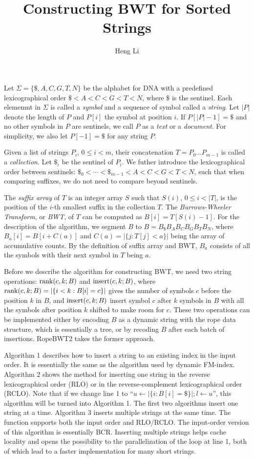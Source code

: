 \documentclass[10pt]{article}
\title{Constructing BWT for Sorted Strings}
\author{Heng Li}
\begin{document}
\maketitle

Let $\Sigma=\{\$,A,C,G,T,N\}$ be the alphabet for DNA with a predefined
lexicographical order $\$<A<C<G<T<N$, where $\$$ is the sentinel.  Each
elememnt in $\Sigma$ is called a \emph{symbol} and a sequence of symbol called
a \emph{string}. Let $|P|$ denote the length of $P$ and $P[i]$ the symbol at
position $i$. If $P[|P|-1]=\$$ and no other symbols in $P$ are sentinels, we
call $P$ as a \emph{text} or a \emph{document}. For simplicity, we also let
$P[-1]=\$$ for any string $P$.

Given a list of strings $P_i$, $0\le i<m$, their concatenation $T=P_0\ldots
P_{m-1}$ is called a \emph{collection}. Let $\$_i$ be the sentinel of $P_i$.
We futher introduce the lexicographical order between sentinels:
$\$_0<\cdots<\$_{m-1}<A<C<G<T<N$, such that when comparing suffixes, we do not
need to compare beyond sentinels.

The \emph{suffix array} of $T$ is an integer array $S$ such that $S(i)$, $0\le
i<|T|$, is the position of the $i$-th smallest suffix in the collection $T$.
The \emph{Burrows-Wheeler Transform}, or \emph{BWT}, of $T$ can be computed as
$B[i]=T[S(i)-1]$. For the description of the algorithm, we segment $B$ to
$B=B_{\$}B_AB_CB_GB_TB_N$, where $B_a[i]=B[i+C(a)]$ and $C(a)=|\{j:T[j]<a\}|$
being the array of accumulative counts. By the definition of suffix array and
BWT, $B_a$ consists of all the symbols with their next symbol in $T$ being
$a$.

Before we describe the algorithm for constructing BWT, we need two string
operations: ${\rm rank}(c,k;B)$ and ${\rm insert}(c,k;B)$, where ${\rm
rank}(c,k;B)=|\{i<k:B[i]=c\}|$ gives the number of symbols $c$ before the
position $k$ in $B$, and ${\rm insert}(c,k;B)$ insert symbol $c$ after $k$
symbols in $B$ with all the symbols after position $k$ shifted to
make room for $c$. These two operations can be implemented either by encoding
$B$ as a dynamic string with the rope data structure, which is essentially a
tree, or by recoding $B$ after each batch of insertions. RopeBWT2 takes the
former approach.

Algorithm 1 describes how to insert a string to an existing index in the input
order. It is essentially the same as the algorithm used by dynamic FM-index.
Algorithm 2 shows the method for inserting one string in the reverse
lexicographical order (RLO) or in the reverse-complement lexicographical order
(RCLO). Note that if we change line 1 to ``$u\gets|\{i:B[i]=\$\}|; l\gets u$'',
this algorithm will be turned into Algorithm 1. The first two algorithms insert
one string at a time. Algorithm 3 inserts multiple strings at the same time.
The function supports both the input order and RLO/RCLO. The input-order
version of this algorithm is essentially BCR. Inserting multiple strings helps
cache locality and opens the possibility to the parallelization of the loop at
line 1, both of which lead to a faster implementation for many short strings.
\end{document}
